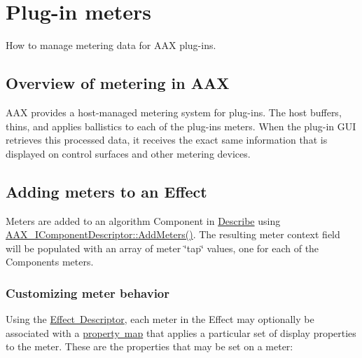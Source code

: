 \hypertarget{a00807}{}\section{Plug-\/in meters}
\label{a00807}
How to manage metering data for A\+AX plug-\/ins. 

\hypertarget{a00807_AdditionalFeatures_Meters_overview}{}\subsection{Overview of metering in A\+AX}\label{a00807_AdditionalFeatures_Meters_overview}
A\+AX provides a host-\/managed metering system for plug-\/ins. The host buffers, thins, and applies ballistics to each of the plug-\/in\textquotesingle{}s meters. When the plug-\/in G\+UI retrieves this processed data, it receives the exact same information that is displayed on control surfaces and other metering devices.\hypertarget{a00807_AdditionalFeatures_Meters_adding}{}\subsection{Adding meters to an Effect}\label{a00807_AdditionalFeatures_Meters_adding}
Meters are added to an algorithm Component in \mbox{\hyperlink{a00796}{Describe}} using \mbox{\hyperlink{a01781_a5e4a61afa3d6510891e16d7179bdaa64}{A\+A\+X\+\_\+\+I\+Component\+Descriptor\+::\+Add\+Meters()}}. The resulting meter context field will be populated with an array of meter \char`\"{}tap\char`\"{} values, one for each of the Component\textquotesingle{}s meters.\hypertarget{a00807_AdditionalFeatures_Meters_adding_properties}{}\subsubsection{Customizing meter behavior}\label{a00807_AdditionalFeatures_Meters_adding_properties}
Using the \mbox{\hyperlink{a01813}{Effect Descriptor}}, each meter in the Effect may optionally be associated with a \mbox{\hyperlink{a01869}{property map}} that applies a particular set of display properties to the meter. These are the properties that may be set on a meter\+:


